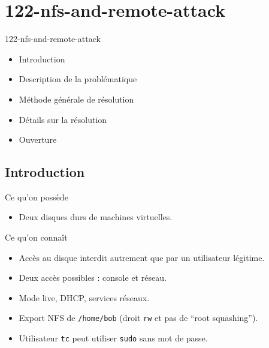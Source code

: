 \documentclass{beamer}
\begin{document}
	\section{122-nfs-and-remote-attack}

        \begin{frame}
            \begin{block}{122-nfs-and-remote-attack}
                \begin{itemize}
                        [circle]
                    \item Introduction
                    \item Description de la problématique
                    \item Méthode générale de résolution
                    \item Détails sur la résolution
                    \item Ouverture
                \end{itemize}
            \end{block}
        \end{frame}

	\subsection{Introduction}

        \begin{frame}[fragile]
            \begin{block}{Ce qu'on possède}
                \begin{itemize}
                        [circle]
                    \item Deux disques durs de machines virtuelles.
                \end{itemize}
            \end{block}
            \begin{block}{Ce qu'on connaît}
                \begin{itemize}
                        [circle]
                    \item Accès au disque interdit autrement que par un utilisateur légitime.
                    \item Deux accès possibles : console et réseau.
                    \item Mode live, DHCP, services réseaux.
                    \item Export NFS de \verb+/home/bob+ (droit \verb+rw+ et pas de \enquote{root squashing}).
                    \item Utilisateur \verb+tc+ peut utiliser \verb+sudo+ sans mot de passe.
                \end{itemize}
            \end{block}
        \end{frame}
\end{document}
